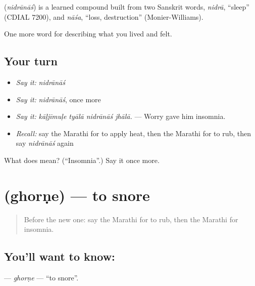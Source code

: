 \begin{cousinweb}
\textbf{} (\emph{nidrānāś}) is a learned compound built from two Sanskrit words, \emph{nidrā}, \textquotedblleft{}sleep\textquotedblright{} (CDIAL 7200), and \emph{nāśa}, \textquotedblleft{}loss, destruction\textquotedblright{} (Monier-Williams).
\end{cousinweb}

\begin{grammarlens}[title={What you've built}]
One more word for describing what you lived and felt.
\end{grammarlens}

\subsection*{Your turn}
\begin{itemize}
\raggedright
  \item \emph{Say it:} \emph{nidrānāś}
  \item \emph{Say it:} \emph{nidrānāś}, once more
  \item \emph{Say it:} \emph{kāḷjīmuḷe tyālā nidrānāś jhālā.} — Worry gave him insomnia.
  \item \emph{Recall:} say the Marathi for to apply heat, then the Marathi for to rub, then say \emph{nidrānāś} again
\end{itemize}

\begin{tcolorbox}[breakable,colback=teal!4,colframe=teal!35!black,title={Before you move on}]
What does  mean? (\textquotedblleft{}Insomnia\textquotedblright{}.) Say it once more.
\end{tcolorbox}
\section[\texorpdfstring{\mr{घोरणे} (ghorṇe)}{घोरणे (ghorṇe)}]{ (ghorṇe) — to snore}

\label{lesson:MR-C491-ghorne}



\begin{quote}
Before the new one: say the Marathi for to rub, then the Marathi for insomnia.
\end{quote}

\subsection*{You'll want to know: }
\textbf{} — \emph{ghorṇe} — \textquotedblleft{}to snore\textquotedblright{}.

